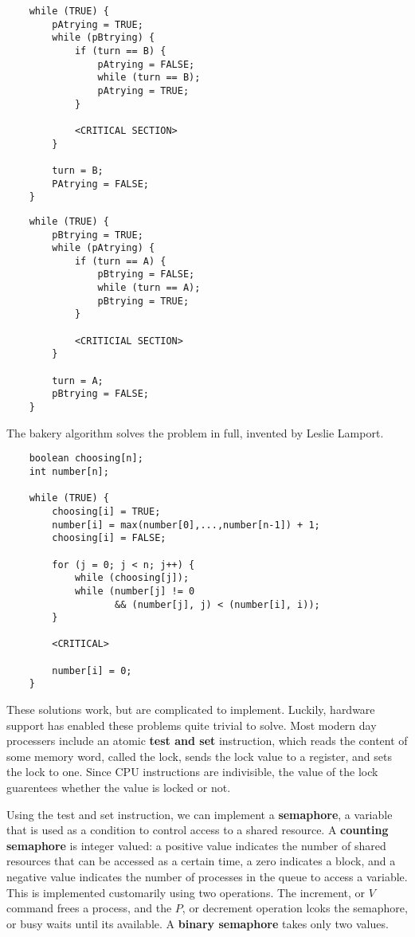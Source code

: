 \begin{multicols}{2}
\begin{verbatim}
    while (TRUE) {
        pAtrying = TRUE;
        while (pBtrying) {
            if (turn == B) {
                pAtrying = FALSE;
                while (turn == B);
                pAtrying = TRUE;
            }

            <CRITICAL SECTION>
        }

        turn = B;
        PAtrying = FALSE;
    }
\end{verbatim}

\begin{verbatim}
    while (TRUE) {
        pBtrying = TRUE;
        while (pAtrying) {
            if (turn == A) {
                pBtrying = FALSE;
                while (turn == A);
                pBtrying = TRUE;
            }

            <CRITICIAL SECTION>
        }

        turn = A;
        pBtrying = FALSE;
    }
\end{verbatim}
\end{multicols}

The bakery algorithm solves the problem in full, invented by Leslie Lamport.

\newpage

\begin{verbatim}
    boolean choosing[n];
    int number[n];

    while (TRUE) {
        choosing[i] = TRUE;
        number[i] = max(number[0],...,number[n-1]) + 1;
        choosing[i] = FALSE;

        for (j = 0; j < n; j++) {
            while (choosing[j]);
            while (number[j] != 0
                   && (number[j], j) < (number[i], i));
        }

        <CRITICAL>

        number[i] = 0;
    }
\end{verbatim}

These solutions work, but are complicated to implement. Luckily, hardware support has enabled these problems quite trivial to solve. Most modern day processers include an atomic {\bf test and set} instruction, which reads the content of some memory word, called the lock, sends the lock value to a register, and sets the lock to one. Since CPU instructions are indivisible, the value of the lock guarentees whether the value is locked or not.

Using the test and set instruction, we can implement a {\bf semaphore}, a variable that is used as a condition to control access to a shared resource.  A {\bf counting semaphore} is integer valued: a positive value indicates the number of shared resources that can be accessed as a certain time, a zero indicates a block, and a negative value indicates the number of processes in the queue to access a variable. This is implemented customarily using two operations. The increment, or $V$ command frees a process, and the $P$, or decrement operation lcoks the semaphore, or busy waits until its available. A {\bf binary semaphore} takes only two values.

